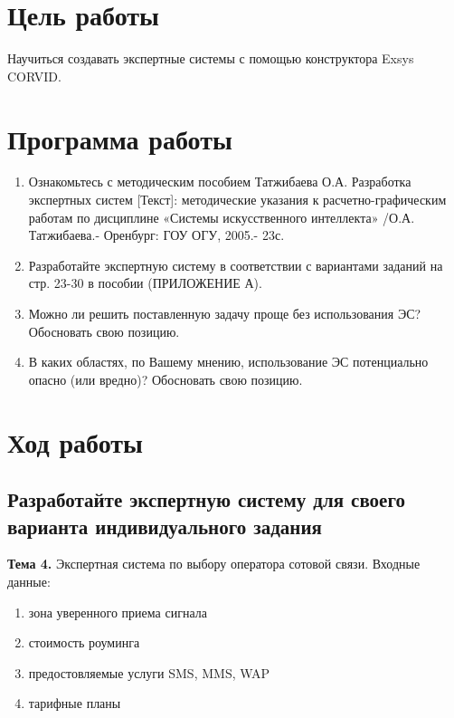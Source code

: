 \documentclass[14pt,a4paper,report]{report}
\begin{document}
\section{Цель работы}

Научиться создавать экспертные системы с помощью конструктора Exsys CORVID.

\section{Программа работы}

\begin{enumerate}
	\item  Ознакомьтесь с методическим пособием Татжибаева О.А. Разработка экспертных систем [Текст]: методические указания к расчетно-графическим работам по дисциплине «Системы искусственного интеллекта» /О.А. Татжибаева.- Оренбург: ГОУ ОГУ, 2005.- 23с.
	
	\item Разработайте экспертную систему в соответствии с вариантами заданий на стр. 23-30 в пособии (ПРИЛОЖЕНИЕ А).
	
	\item Можно ли решить поставленную задачу проще без использования ЭС? Обосновать свою позицию.
	
	\item В каких областях, по Вашему мнению, использование ЭС потенциально опасно (или вредно)? Обосновать свою позицию.
\end{enumerate}

\clearpage

\section{Ход работы}

\subsection{Разработайте экспертную систему для своего варианта индивидуального задания}

\textbf{Тема 4.} Экспертная система по выбору оператора сотовой связи. Входные данные:

\begin{enumerate}
	\item зона уверенного приема сигнала
	\item стоимость роуминга
	\item предостовляемые услуги SMS, MMS, WAP
	\item тарифные планы
\end{enumerate}
\end{document}
